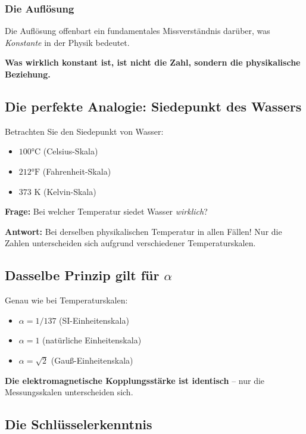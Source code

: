 \documentclass[12pt,a4paper]{article}
\begin{document}
	\subsubsection{Die Auflösung}
	
	Die Auflösung offenbart ein fundamentales Missverständnis darüber, was \textit{Konstante} in der Physik bedeutet.
	
	\textbf{Was wirklich konstant ist, ist nicht die Zahl, sondern die physikalische Beziehung.}
	
	\subsection{Die perfekte Analogie: Siedepunkt des Wassers}
	
	Betrachten Sie den Siedepunkt von Wasser:
	\begin{itemize}
		\item $100°\text{C}$ (Celsius-Skala)
		\item $212°\text{F}$ (Fahrenheit-Skala)
		\item $373\text{ K}$ (Kelvin-Skala)
	\end{itemize}
	
	\textbf{Frage:} Bei welcher Temperatur siedet Wasser \textit{wirklich}?
	
	\textbf{Antwort:} Bei derselben physikalischen Temperatur in allen Fällen! Nur die Zahlen unterscheiden sich aufgrund verschiedener Temperaturskalen.
	
	\subsection{Dasselbe Prinzip gilt für $\alpha$}
	
	Genau wie bei Temperaturskalen:
	\begin{itemize}
		\item $\alpha = 1/137$ (SI-Einheitenskala)
		\item $\alpha = 1$ (natürliche Einheitenskala)
		\item $\alpha = \sqrt{2}$ (Gauß-Einheitenskala)
	\end{itemize}
	
	\textbf{Die elektromagnetische Kopplungsstärke ist identisch} -- nur die Messungsskalen unterscheiden sich.
	
	\subsection{Die Schlüsselerkenntnis}
	
\end{document}
